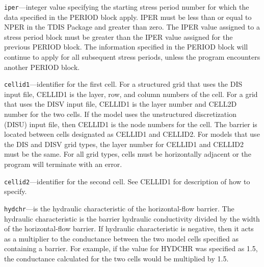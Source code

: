 \begin{description}
\item \texttt{iper}---integer value specifying the starting stress period number for which the data specified in the PERIOD block apply.  IPER must be less than or equal to NPER in the TDIS Package and greater than zero.  The IPER value assigned to a stress period block must be greater than the IPER value assigned for the previous PERIOD block.  The information specified in the PERIOD block will continue to apply for all subsequent stress periods, unless the program encounters another PERIOD block.

\item \texttt{cellid1}---identifier for the first cell.  For a structured grid that uses the DIS input file, CELLID1 is the layer, row, and column numbers of the cell.   For a grid that uses the DISV input file, CELLID1 is the layer number and CELL2D number for the two cells.  If the model uses the unstructured discretization (DISU) input file, then CELLID1 is the node numbers for the cell.  The barrier is located between cells designated as CELLID1 and CELLID2.  For models that use the DIS and DISV grid types, the layer number for CELLID1 and CELLID2 must be the same.  For all grid types, cells must be horizontally adjacent or the program will terminate with an error.

\item \texttt{cellid2}---identifier for the second cell. See CELLID1 for description of how to specify.

\item \texttt{hydchr}---is the hydraulic characteristic of the horizontal-flow barrier. The hydraulic characteristic is the barrier hydraulic conductivity divided by the width of the horizontal-flow barrier. If hydraulic characteristic is negative, then it acts as a multiplier to the conductance between the two model cells specified as containing a barrier. For example, if the value for HYDCHR was specified as 1.5, the conductance calculated for the two cells would be multiplied by 1.5.

\end{description}

